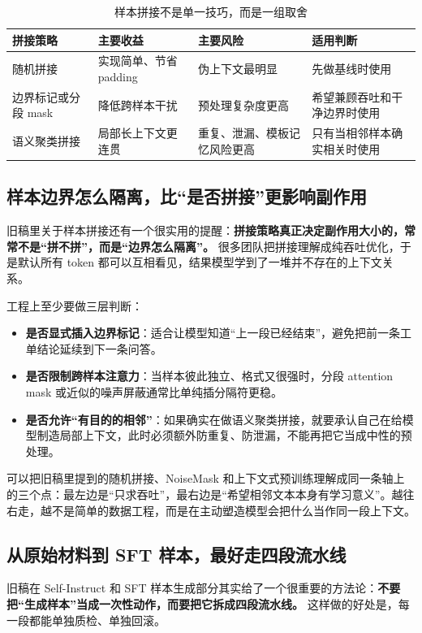 \begin{table}[H]
\centering
\small
\begin{tabularx}{\textwidth}{>{\raggedright\arraybackslash}p{3cm}>{\raggedright\arraybackslash}p{2.8cm}>{\raggedright\arraybackslash}p{2.8cm}>{\raggedright\arraybackslash}X}
\toprule
\textbf{拼接策略} & \textbf{主要收益} & \textbf{主要风险} & \textbf{适用判断} \\
\midrule
随机拼接 & 实现简单、节省 padding & 伪上下文最明显 & 先做基线时使用 \\
边界标记或分段 mask & 降低跨样本干扰 & 预处理复杂度更高 & 希望兼顾吞吐和干净边界时使用 \\
语义聚类拼接 & 局部长上下文更连贯 & 重复、泄漏、模板记忆风险更高 & 只有当相邻样本确实相关时使用 \\
\bottomrule
\end{tabularx}
\caption{样本拼接不是单一技巧，而是一组取舍}
\label{tab:packing-strategies}
\end{table}

\subsection{样本边界怎么隔离，比“是否拼接”更影响副作用}
旧稿里关于样本拼接还有一个很实用的提醒：\textbf{拼接策略真正决定副作用大小的，常常不是“拼不拼”，而是“边界怎么隔离”。} 很多团队把拼接理解成纯吞吐优化，于是默认所有 token 都可以互相看见，结果模型学到了一堆并不存在的上下文关系。

工程上至少要做三层判断：
\begin{itemize}
  \item \textbf{是否显式插入边界标记}：适合让模型知道“上一段已经结束”，避免把前一条工单结论延续到下一条问答。
  \item \textbf{是否限制跨样本注意力}：当样本彼此独立、格式又很强时，分段 attention mask 或近似的噪声屏蔽通常比单纯插分隔符更稳。
  \item \textbf{是否允许“有目的的相邻”}：如果确实在做语义聚类拼接，就要承认自己在给模型制造局部上下文，此时必须额外防重复、防泄漏，不能再把它当成中性的预处理。
\end{itemize}

可以把旧稿里提到的随机拼接、NoiseMask 和上下文式预训练理解成同一条轴上的三个点：最左边是“只求吞吐”，最右边是“希望相邻文本本身有学习意义”。越往右走，越不是简单的数据工程，而是在主动塑造模型会把什么当作同一段上下文。

\subsection{从原始材料到 SFT 样本，最好走四段流水线}
旧稿在 Self-Instruct 和 SFT 样本生成部分其实给了一个很重要的方法论：\textbf{不要把“生成样本”当成一次性动作，而要把它拆成四段流水线。} 这样做的好处是，每一段都能单独质检、单独回滚。

